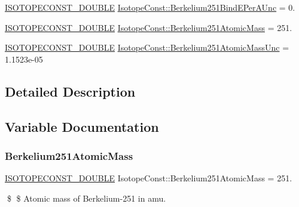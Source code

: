\begin{DoxyCompactItemize}
\mbox{\hyperlink{group___isotope_const-_macros_ga8f45a7272ce02c0b4c65c44636ed719a}{I\+S\+O\+T\+O\+P\+E\+C\+O\+N\+S\+T\+\_\+\+D\+O\+U\+B\+LE}} \mbox{\hyperlink{group___isotope_const-_berkelium-_bk251_ga2df34c20cb7c3d3b9e013912f22d9fe3}{Isotope\+Const\+::\+Berkelium251\+Bind\+E\+Per\+A\+Unc}} = 0.
\item 
\mbox{\hyperlink{group___isotope_const-_macros_ga8f45a7272ce02c0b4c65c44636ed719a}{I\+S\+O\+T\+O\+P\+E\+C\+O\+N\+S\+T\+\_\+\+D\+O\+U\+B\+LE}} \mbox{\hyperlink{group___isotope_const-_berkelium-_bk251_ga03bd6ae5f3517126a981022deb75849c}{Isotope\+Const\+::\+Berkelium251\+Atomic\+Mass}} = 251.
\item 
\mbox{\hyperlink{group___isotope_const-_macros_ga8f45a7272ce02c0b4c65c44636ed719a}{I\+S\+O\+T\+O\+P\+E\+C\+O\+N\+S\+T\+\_\+\+D\+O\+U\+B\+LE}} \mbox{\hyperlink{group___isotope_const-_berkelium-_bk251_ga45c9cb029732670d46fa454b1c3b7be6}{Isotope\+Const\+::\+Berkelium251\+Atomic\+Mass\+Unc}} = 1.\+1523e-\/05
\end{DoxyCompactItemize}


\subsection{Detailed Description}


\subsection{Variable Documentation}
\mbox{\label{group___isotope_const-_berkelium-_bk251_ga03bd6ae5f3517126a981022deb75849c}} 
\subsubsection{\texorpdfstring{Berkelium251\+Atomic\+Mass}{Berkelium251AtomicMass}}
{\footnotesize\ttfamily \mbox{\hyperlink{group___isotope_const-_macros_ga8f45a7272ce02c0b4c65c44636ed719a}{I\+S\+O\+T\+O\+P\+E\+C\+O\+N\+S\+T\+\_\+\+D\+O\+U\+B\+LE}} Isotope\+Const\+::\+Berkelium251\+Atomic\+Mass = 251.}

\$ \$ Atomic mass of Berkelium-\/251 in amu. \mbox{\label{group___isotope_const-_berkelium-_bk251_ga45c9cb029732670d46fa454b1c3b7be6}} 
